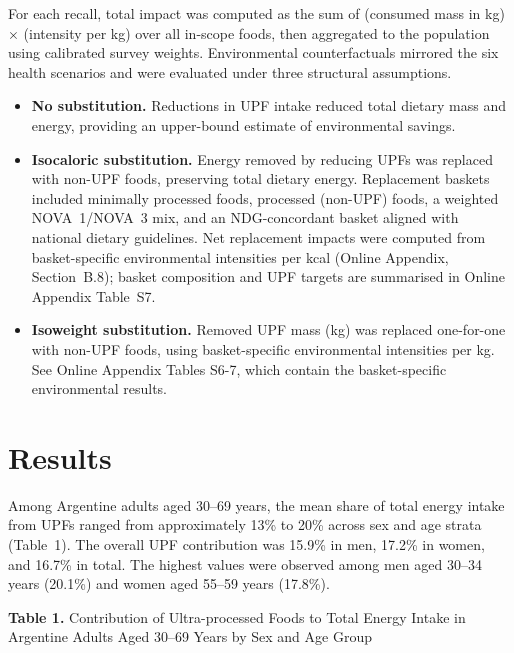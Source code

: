 \documentclass{article}
\begin{document}
For each recall, total impact was computed as the sum of (consumed mass in kg) $\times$ (intensity per kg) over all in-scope foods, then aggregated to the population using calibrated survey weights. Environmental counterfactuals mirrored the six health scenarios and were evaluated under three structural assumptions.

\begin{itemize}
    \item \textbf{No substitution.} Reductions in UPF intake reduced total dietary mass and energy, providing an upper-bound estimate of environmental savings.
    \item \textbf{Isocaloric substitution.} Energy removed by reducing UPFs was replaced with non-UPF foods, preserving total dietary energy. Replacement baskets included minimally processed foods, processed (non-UPF) foods, a weighted NOVA~1/NOVA~3 mix, and an NDG-concordant basket aligned with national dietary guidelines.\cite{NDG2016} Net replacement impacts were computed from basket-specific environmental intensities per kcal (Online Appendix, Section~B.8); basket composition and UPF targets are summarised in Online Appendix Table~S7.
    \item \textbf{Isoweight substitution.} Removed UPF mass (kg) was replaced one-for-one with non-UPF foods, using basket-specific environmental intensities per kg. See Online Appendix Tables S6-7, which contain the basket-specific environmental results.
\end{itemize}

\section{Results}\label{results}

Among Argentine adults aged 30--69 years, the mean share of total energy intake from UPFs ranged from approximately 13\% to 20\% across sex and age strata (Table~1). The overall UPF contribution was 15.9\% in men, 17.2\% in women, and 16.7\% in total. The highest values were observed among men aged 30--34 years (20.1\%) and women aged 55--59 years (17.8\%).

\vspace{0.8em}
\textbf{Table 1.} Contribution of Ultra-processed Foods to Total Energy Intake in Argentine Adults Aged 30--69 Years by Sex and Age Group
\end{document}
